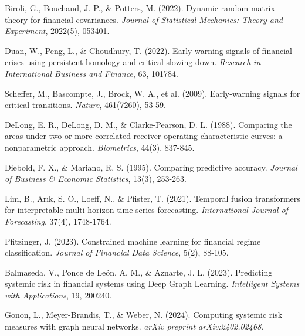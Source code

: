 \documentclass[
  12pt,
]{article}
\begin{document}
Biroli, G., Bouchaud, J. P., \& Potters, M. (2022). Dynamic random
matrix theory for financial covariances.
\emph{Journal of Statistical Mechanics: Theory and Experiment}, 2022(5),
053401.

Duan, W., Peng, L., \& Choudhury, T. (2022). Early warning signals of financial crises using persistent homology and critical slowing down. \emph{Research in International Business and Finance}, 63, 101784.

Scheffer, M., Bascompte, J., Brock, W. A., et al. (2009). Early-warning signals for critical transitions. \emph{Nature}, 461(7260), 53-59.


DeLong, E. R., DeLong, D. M., \& Clarke-Pearson, D. L. (1988). Comparing
the areas under two or more correlated receiver operating characteristic
curves: a nonparametric approach. \emph{Biometrics}, 44(3), 837-845.

Diebold, F. X., \& Mariano, R. S. (1995). Comparing predictive accuracy.
\emph{Journal of Business \& Economic Statistics}, 13(3), 253-263.

Lim, B., Arık, S. Ö., Loeff, N., \& Pfister, T. (2021). Temporal fusion
transformers for interpretable multi-horizon time series forecasting.
\emph{International Journal of Forecasting}, 37(4), 1748-1764.

Pfitzinger, J. (2023). Constrained machine learning for financial regime
classification. \emph{Journal of Financial Data Science}, 5(2), 88-105.

Balmaseda, V., Ponce de León, A. M., \& Aznarte, J. L. (2023). Predicting systemic risk in financial systems using Deep Graph Learning. \emph{Intelligent Systems with Applications}, 19, 200240.

Gonon, L., Meyer-Brandis, T., \& Weber, N. (2024). Computing systemic risk measures with graph neural networks. \emph{arXiv preprint arXiv:2402.02468}. \endgroup
\end{document}
